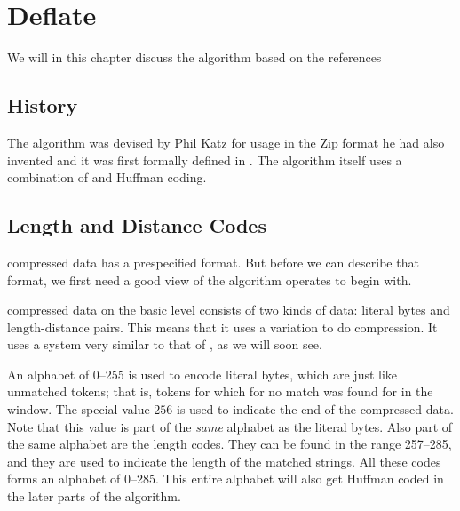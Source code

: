 \begin{comment}
  
\end{comment}

\chapter{Deflate}
\label{cha:deflate}

We will in this chapter discuss the  algorithm based on the
references
\cite{pkware:_appnot,deutsch96:_deflat_compr_data_format_specif,Salomon:2004:DCC,feldspar:_explan_deflat_algor}

\section{History}

The  algorithm was devised by Phil Katz for usage in the Zip
format he had also invented and it was first formally defined in
\cite{deutsch96:_deflat_compr_data_format_specif}. The algorithm
itself uses a combination of \lzone and Huffman coding.

\section{Length and Distance Codes}

 compressed data has a prespecified format. But before we can
describe that format, we first need a good view of the algorithm
operates to begin with.

 compressed data on the basic level consists of two kinds of
data: literal bytes and length-distance pairs. This means that it uses
a \lzone variation to do compression. It uses a system very similar to
that of \lzss, as we will soon see.

An alphabet of 0--255 is used to encode literal bytes, which are just
like unmatched tokens; that is, tokens for which for no match was
found for in the \lzone window. The special value $256$ is used to
indicate the end of the compressed data. Note that this value is part
of the \textit{same} alphabet as the literal bytes. Also part of the
same alphabet are the length codes. They can be found in the range
257--285, and they are used to indicate the length of the \lzone
matched strings. All these codes forms an alphabet of 0--285. This
entire alphabet will also get Huffman coded in the later parts of the
algorithm.

